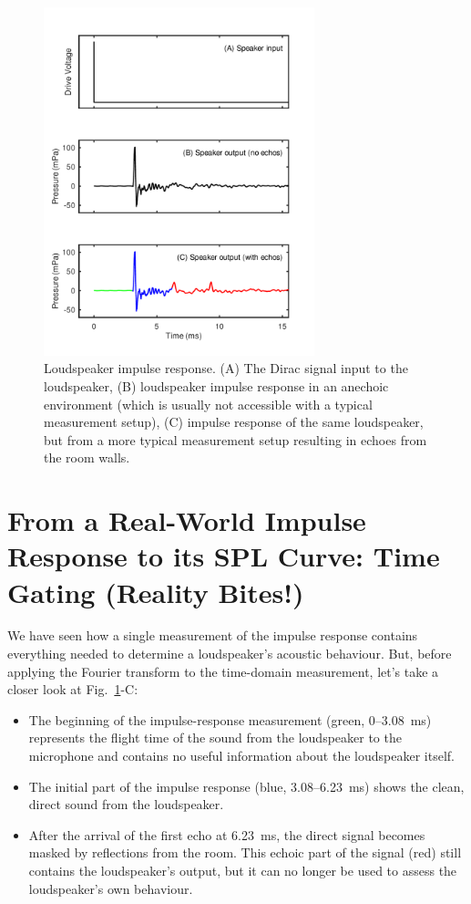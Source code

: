 \documentclass[12pt,a4paper]{article}
\providecommand{\seclabel}[1]{\label{sec:#1}}
\providecommand{\figlabel}[1]{\label{fig:#1}}
\providecommand{\figr}[1]{Fig.~\ref{fig:#1}}
\begin{document}
\begin{figure}[tbp]
  \begin{center}
    \includegraphics[width=0.7\textwidth]{FIGURE1}
    \caption{Loudspeaker impulse response. (A) The Dirac signal input to the loudspeaker, (B) loudspeaker impulse response in an anechoic environment (which is usually not accessible with a typical measurement setup), (C) impulse response of the same loudspeaker, but from a more typical measurement setup resulting in echoes from the room walls.}
    \figlabel{FIGURE1}
  \end{center}
\end{figure}


\section{From a Real-World Impulse Response to its SPL Curve: Time Gating (Reality Bites!)}\seclabel{from_IR_to_SPL}

We have seen how a single measurement of the impulse response contains everything needed to determine a loudspeaker’s acoustic behaviour.
But, before applying the Fourier transform to the time-domain measurement, let's take a closer look at \mbox{\figr{FIGURE1}-C}:
\begin{itemize}
\item The beginning of the impulse-response measurement (green, 0--\SI{3.08}{ms}) represents the flight time of the sound from the loudspeaker to the microphone and contains no useful information about the loudspeaker itself.
\item The initial part of the impulse response (blue, 3.08--\SI{6.23}{ms}) shows the clean, direct sound from the loudspeaker.
\item After the arrival of the first echo at \SI{6.23}{ms}, the direct signal becomes masked by reflections from the room.
This echoic part of the signal (red) still contains the loudspeaker’s output, but it can no longer be used to assess the loudspeaker’s own behaviour.
\end{itemize}
\end{document}
